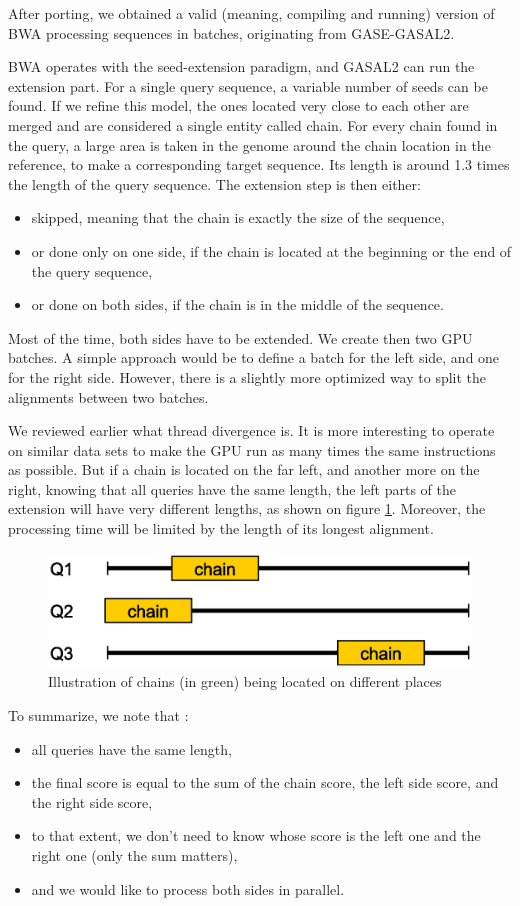 After porting, we obtained a valid (meaning, compiling and running) version of BWA processing sequences in batches, originating from GASE-GASAL2.

BWA operates with the seed-extension paradigm, and GASAL2 can run the extension part. For a single query sequence, a variable number of seeds can be found. If we refine this model, the ones located very close to each other are merged and are considered a single entity called chain. For every chain found in the query, a large area is taken in the genome around the chain location in the reference, to make a corresponding target sequence. Its length is around 1.3 times the length of the query sequence. The extension step is then either:

\begin{itemize}
	\item skipped, meaning that the chain is exactly the size of the sequence,
	\item or done only on one side, if the chain is located at the beginning or the end of the query sequence,
	\item or done on both sides, if the chain is in the middle of the sequence.
\end{itemize}

Most of the time, both sides have to be extended. We create then two GPU batches. A simple approach would be to define a batch for the left side, and one for the right side. However, there is a slightly more optimized way to split the alignments between two batches.

We reviewed earlier what thread divergence is. It is more interesting to operate on similar data sets to make the GPU run as many times the same instructions as possible. But if a chain is located on the far left, and another more on the right, knowing that all queries have the same length, the left parts of the extension will have very different lengths, as shown on figure \ref{fig:seds-different-chains}. Moreover, the processing time will be limited by the length of its longest alignment. 
\begin{figure}[h!]
	\centering
	\includegraphics[width=0.7\linewidth]{seds-different-chains}
	\caption{Illustration of chains (in green) being located on different places}
	\label{fig:seds-different-chains}
\end{figure}
To summarize, we note that :
\begin{itemize}
	\item all queries have the same length,
	\item the final score is equal to the sum of the chain score, the left side score, and the right side score,
	\item to that extent, we don't need to know whose score is the left one and the right one (only the sum matters),
	\item and we would like to process both sides in parallel.
\end{itemize}

